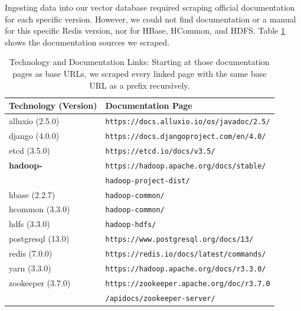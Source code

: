 Ingesting data into our vector database required scraping official documentation for each specific version. However, we could not find documentation or a manual for this specific Redis version, nor for HBase, HCommon, and HDFS. Table \ref{tab:technology_documentation} shows the documentation sources we scraped.

\begin{table}[h]
    \centering
    \begin{tabular}{|l|l|}
        \hline
        \textbf{Technology (Version)} & \textbf{Documentation Page} \\
        \hline
        alluxio (2.5.0) & \texttt{https://docs.alluxio.io/os/javadoc/2.5/} \\
        django (4.0.0) & \texttt{https://docs.djangoproject.com/en/4.0/} \\
        etcd (3.5.0) & \texttt{https://etcd.io/docs/v3.5/} \\
        \textbf{hadoop-} & \texttt{https://hadoop.apache.org/docs/stable/}\\
        & \hspace{0.25cm} \texttt{hadoop-project-dist/} \\
        \hspace{0.15cm} hbase (2.2.7) & \hspace{0.5cm} \texttt{hadoop-common/} \\
        \hspace{0.15cm} hcommon (3.3.0) & \hspace{0.5cm} \texttt{hadoop-common/} \\
        \hspace{0.15cm} hdfs (3.3.0) & \hspace{0.5cm} \texttt{hadoop-hdfs/} \\
        postgresql (13.0) & \texttt{https://www.postgresql.org/docs/13/} \\
        redis (7.0.0) & \texttt{https://redis.io/docs/latest/commands/} \\
        yarn (3.3.0) & \texttt{https://hadoop.apache.org/docs/r3.3.0/} \\
        zookeeper (3.7.0) & \texttt{https://zookeeper.apache.org/doc/r3.7.0} \\
        & \hspace{0.25cm} \texttt{/apidocs/zookeeper-server/} \\
        \hline
    \end{tabular}
    \caption{Technology and Documentation Links: Starting at those documentation pages as base URLs, we scraped every linked page with the same base URL as a prefix recursively.}
    \label{tab:technology_documentation}
\end{table}

